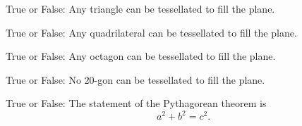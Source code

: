 \documentclass[nooutcomes,noauthor]{ximera}
\author{Bart Snapp}
\begin{document}
\maketitle





\begin{exercise}
  True or False: Any triangle can be tessellated to fill the plane.
\end{exercise}



\begin{exercise}
  True or False: Any quadrilateral can be tessellated to fill the
  plane.
\end{exercise}



\begin{exercise}
  True or False: Any octagon can be tessellated to fill the plane. 
\end{exercise}



\begin{exercise}  
  True or False: No $20$-gon can be tessellated to fill the plane.
\end{exercise}

\begin{exercise}  
  True or False:
  The statement of the Pythagorean theorem is
  \[
  a^2 + b^2 = c^2.
  \]
\end{exercise}



\end{document}

